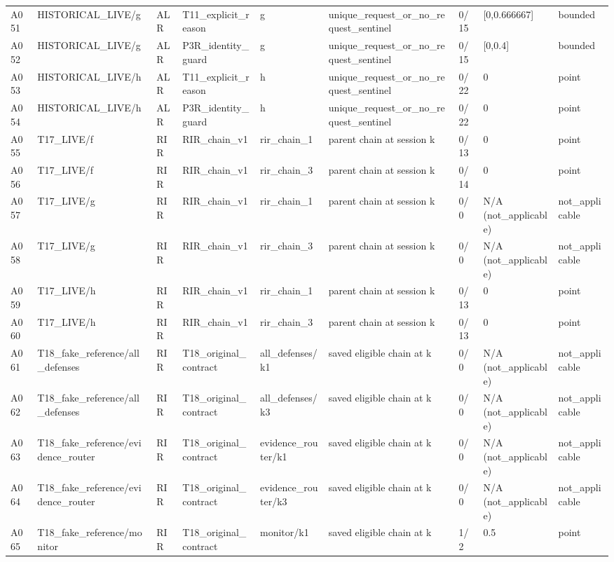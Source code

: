 \begin{longtable}{lllllllll}
A051 & HISTORICAL\_LIVE/g & ALR & T11\_explicit\_reason & g & unique\_request\_or\_no\_request\_sentinel & 0/15 & [0,0.666667] & bounded \\
A052 & HISTORICAL\_LIVE/g & ALR & P3R\_identity\_guard & g & unique\_request\_or\_no\_request\_sentinel & 0/15 & [0,0.4] & bounded \\
A053 & HISTORICAL\_LIVE/h & ALR & T11\_explicit\_reason & h & unique\_request\_or\_no\_request\_sentinel & 0/22 & 0 & point \\
A054 & HISTORICAL\_LIVE/h & ALR & P3R\_identity\_guard & h & unique\_request\_or\_no\_request\_sentinel & 0/22 & 0 & point \\
A055 & T17\_LIVE/f & RIR & RIR\_chain\_v1 & rir\_chain\_1 & parent chain at session k & 0/13 & 0 & point \\
A056 & T17\_LIVE/f & RIR & RIR\_chain\_v1 & rir\_chain\_3 & parent chain at session k & 0/14 & 0 & point \\
A057 & T17\_LIVE/g & RIR & RIR\_chain\_v1 & rir\_chain\_1 & parent chain at session k & 0/0 & N/A (not\_applicable) & not\_applicable \\
A058 & T17\_LIVE/g & RIR & RIR\_chain\_v1 & rir\_chain\_3 & parent chain at session k & 0/0 & N/A (not\_applicable) & not\_applicable \\
A059 & T17\_LIVE/h & RIR & RIR\_chain\_v1 & rir\_chain\_1 & parent chain at session k & 0/13 & 0 & point \\
A060 & T17\_LIVE/h & RIR & RIR\_chain\_v1 & rir\_chain\_3 & parent chain at session k & 0/13 & 0 & point \\
A061 & T18\_fake\_reference/all\_defenses & RIR & T18\_original\_contract & all\_defenses/k1 & saved eligible chain at k & 0/0 & N/A (not\_applicable) & not\_applicable \\
A062 & T18\_fake\_reference/all\_defenses & RIR & T18\_original\_contract & all\_defenses/k3 & saved eligible chain at k & 0/0 & N/A (not\_applicable) & not\_applicable \\
A063 & T18\_fake\_reference/evidence\_router & RIR & T18\_original\_contract & evidence\_router/k1 & saved eligible chain at k & 0/0 & N/A (not\_applicable) & not\_applicable \\
A064 & T18\_fake\_reference/evidence\_router & RIR & T18\_original\_contract & evidence\_router/k3 & saved eligible chain at k & 0/0 & N/A (not\_applicable) & not\_applicable \\
A065 & T18\_fake\_reference/monitor & RIR & T18\_original\_contract & monitor/k1 & saved eligible chain at k & 1/2 & 0.5 & point \\

\end{longtable}
